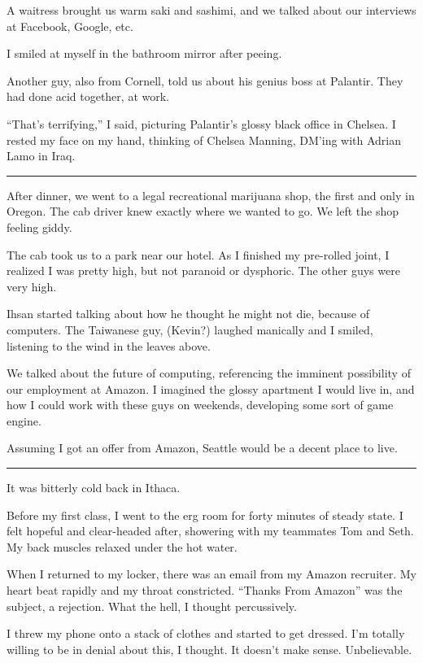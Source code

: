 A waitress brought us warm saki and sashimi, and we talked about our interviews
at Facebook, Google, etc.

I smiled at myself in the bathroom mirror after peeing.

Another guy, also from Cornell, told us about his genius boss at Palantir.  They
had done acid together, at work.

``That's terrifying,'' I said, picturing Palantir's glossy black office in
Chelsea.  I rested my face on my hand, thinking of Chelsea Manning, DM'ing with
Adrian Lamo in Iraq.

\plainfancybreak{12pt}{2}{}

After dinner, we went to a legal recreational marijuana shop, the first and only
in Oregon.  The cab driver knew exactly where we wanted to go.  We left the shop
feeling giddy.

The cab took us to a park near our hotel.  As I finished my pre-rolled joint, I
realized I was pretty high, but not paranoid or dysphoric.   The other guys were
very high.

Ihsan started talking about how he thought he might not die, because of
computers.  The Taiwanese guy, (Kevin?) laughed manically and I smiled,
listening to the wind in the leaves above.

We talked about the future of computing, referencing the imminent possibility of
our employment at Amazon.  I imagined the glossy apartment I would live in, and
how I could work with these guys on weekends, developing some sort of game
engine.

Assuming I got an offer from Amazon, Seattle would be a decent place to live.

\plainfancybreak{12pt}{2}{}

It was bitterly cold back in Ithaca.

Before my first class, I went to the erg room for forty minutes of steady state.
I felt hopeful and clear-headed after, showering with my teammates Tom and Seth.
My back muscles relaxed under the hot water.

When I returned to my locker, there was an email from my Amazon recruiter. My
heart beat rapidly and my throat constricted. ``Thanks From Amazon'' was the
subject, a rejection.  What the hell, I thought percussively.

I threw my phone onto a stack of clothes and started to get dressed. I'm
totally willing to be in denial about this, I thought. It doesn't make sense.
Unbelievable.

